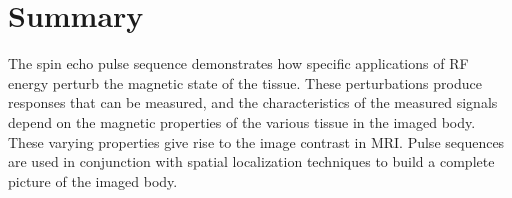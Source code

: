 \documentclass[12pt]{article} %
\begin{document}
\section{Summary}
The spin echo pulse sequence demonstrates how specific applications of RF energy perturb the magnetic state of the tissue. These perturbations produce responses that can be measured, and the characteristics of the measured signals depend on the magnetic properties of the various tissue in the imaged body. These varying properties give rise to the image contrast in MRI. Pulse sequences are used in conjunction with spatial localization techniques to build a complete picture of the imaged body.



\end{document}

